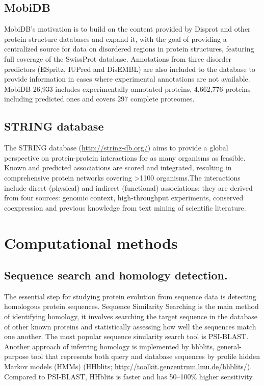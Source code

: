 \documentclass[11pt, a4paper,oneside]{report}
\begin{document}
\subsection{MobiDB}
MobiDB's motivation is to build on the content provided by Disprot and other protein structure databases and expand it, with the goal of providing a centralized source for data on disordered regions in protein structures, featuring full coverage of the SwissProt database. Annotations from three disorder predictors (ESpritz, IUPred and DisEMBL) are also included to the database to provide information in cases where experimental annotations are not available. MobiDB 26,933 includes experimentally annotated proteins, 4,662,776 proteins including predicted ones and covers 297 complete proteomes\cite{DiDomenico2012}.
\subsection{STRING database}
The STRING database (\url{http://string-db.org/}) aims to provide a global perspective on protein-protein interactions for as many organisms as feasible\cite{Franceschini2013}. Known and predicted associations are scored and integrated, resulting in comprehensive protein networks covering >1100 organisms.The interactions include direct (physical) and indirect (functional) associations; they are derived from four sources: genomic context, high-throughput experiments, conserved coexpression and previous knowledge from text mining of scientific literature.

\section{Computational methods}
\subsection{Sequence search and homology detection.} 
The essential step for studying protein evolution from sequence data is detecting homologous protein sequences. Sequence Similarity Searching is the main method of identifying homology, it involves searching the target sequence in the database of other known proteins and statistically assessing how well the sequences match one another. The most popular sequence similarity search tool is PSI-BLAST. Another approach of inferring homology is implemented by hhblits, general-purpose tool that represents both query and database sequences by profile hidden Markov models (HMMs) (HHblits; \url{http://toolkit.genzentrum.lmu.de/hhblits/}). Compared to PSI-BLAST, HHblits is faster and has 50–100\% higher sensitivity\cite{Remmert2012}.  
\end{document}
